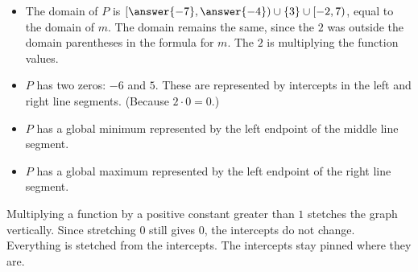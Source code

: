 \documentclass{ximera}
\begin{document}
\begin{example}
\begin{image}
\end{image}




\begin{itemize}

\item The domain of $P$ is $\left[\answer{-7},\answer{-4}\right) \cup \{3\} \cup [-2,7)$, equal to the domain of $m$. The domain remains the same, since the $2$ was outside the domain parentheses in the formula for $m$. The $2$ is multiplying the function values.
\item $P$ has two zeros: $-6$ and $5$. These are represented by intercepts in the left and right line segments. (Because $2 \cdot 0 = 0$.) 
\item $P$ has a global minimum represented by the left endpoint of the middle line segment. 
\item $P$ has a global maximum represented by the left endpoint of the right line segment.

\end{itemize}


\end{example}


Multiplying a function by a positive constant greater than $1$ stetches the graph vertically.  Since stretching $0$ still gives $0$, the intercepts do not change.  Everything is stetched from the intercepts. The intercepts stay pinned where they are.
\end{document}

